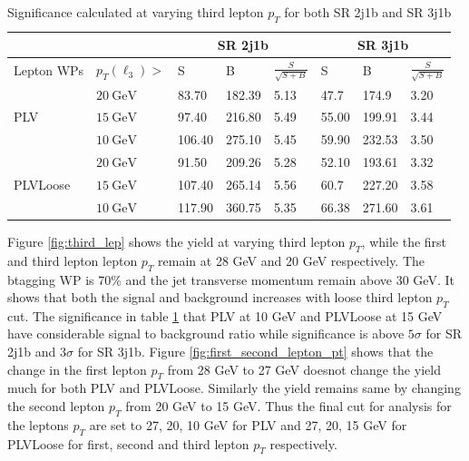 \vspace*{-0.2cm}
\begin{table}[h!]
\centering
\begin{tabular}{@{} *8l  @{}}
\toprule
& & \multicolumn{3}{c}{SR 2j1b}  & \multicolumn{3}{c}{SR 3j1b}\\ 
 \midrule
Lepton WPs & $p_{T}(\ell_3) > $ & S & B & $\frac{S}{\sqrt{S+B}}$   & S & B & $\frac{S}{\sqrt{S+B}}$\\ [0.2cm]
\toprule
 \multirow{3}{*}{PLV} & $ \SI{20}{\GeV}$ & 83.70 & 182.39 &  5.13  & 47.7 & 174.9 &  3.20  \\

  & $ \SI{15}{\GeV}$ & 97.40 & 216.80 & 5.49 & 55.00 & 199.91 & 3.44  \\ 

 & $ \SI{10}{\GeV}$ & 106.40 & 275.10  & 5.45  & 59.90 & 232.53  & 3.50  \\
\midrule
 \multirow{3}{*}{PLVLoose} & $ \SI{20}{\GeV}$ & 91.50 & 209.26 & 5.28 & 52.10 & 193.61 & 3.32  \\

  & $ \SI{15}{\GeV}$ & 107.40 &  265.14 & 5.56 & 60.7 &  227.20 & 3.58  \\ 

 & $ \SI{10}{\GeV}$ & 117.90 & 360.75  & 5.35 & 66.38 & 271.60  & 3.61    \\
\bottomrule
\end{tabular}
\vspace*{-0.1cm}
\caption{Significance calculated at varying third lepton $p_{T}$ for both SR 2j1b and SR 3j1b}
\label{tab:third_lep_opt}
\end{table}

Figure \ref{fig:third_lep} shows the yield at varying third lepton $p_{T}$, while the first and third lepton lepton $p_{T}$ remain at 28 GeV and 20 GeV respectively. The btagging WP is 70\% and the jet transverse momentum remain above 30 GeV. It shows that both the signal and background increases with loose third lepton $p_{T}$ cut. The significance in table \ref{tab:third_lep_opt} that PLV at 10 GeV and PLVLoose at 15 GeV have considerable signal to background ratio while significance is above $5 \sigma$ for SR 2j1b and $3 \sigma$ for SR 3j1b. Figure \ref{fig:first_second_lepton_pt} shows that the change in the first lepton $p_{T}$ from 28 GeV to 27 GeV doesnot change the yield much for both PLV and PLVLoose. Similarly the yield remains same by changing the second lepton $p_{T}$ from 20 GeV to 15 GeV. Thus the final cut for analysis for the leptons $p_{T}$ are set to 27, 20, 10 GeV for PLV and 27, 20, 15 GeV for PLVLoose for first, second and third lepton $p_{T}$ respectively.

